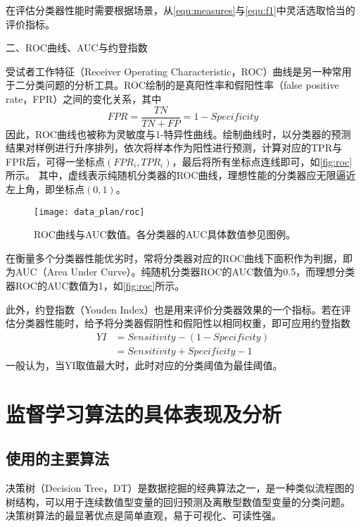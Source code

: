 在评估分类器性能时需要根据场景，从\autoref{equ:measures}与\autoref{equ:f1}中灵活选取恰当的评价指标。

二、ROC曲线、AUC与约登指数

受试者工作特征（Receiver Operating Characteristic，ROC）曲线是另一种常用于二分类问题的分析工具。ROC绘制的是真阳性率和假阳性率（false positive rate，FPR）之间的变化关系，其中
\begin{equation}
      \label{equ:fpr}
      FPR=\frac{TN}{TN+FP}=1-Specificity
\end{equation}
因此，ROC曲线也被称为灵敏度与1-特异性曲线。绘制曲线时，以分类器的预测结果对样例进行升序排列，依次将样本作为阳性进行预测，计算对应的TPR与FPR后，可得一坐标点$({FPR}_i,{TPR}_i)$，最后将所有坐标点连线即可，如\autoref{fig:roc}所示。
其中，虚线表示纯随机分类器的ROC曲线，理想性能的分类器应无限逼近左上角，即坐标点$(0,1)$。
\begin{figure}[htbp]
      \centering
      \texttt{[image: data\_plan/roc]}
      \caption[ROC曲线与AUC数值]{\label{fig:roc}ROC曲线与AUC数值。各分类器的AUC具体数值参见图例。}
\end{figure}

在衡量多个分类器性能优劣时，常将分类器对应的ROC曲线下面积作为判据，即为AUC（Area Under Curve）。纯随机分类器ROC的AUC数值为0.5，而理想分类器ROC的AUC数值为1，如\autoref{fig:roc}所示。

此外，约登指数（Youden Index）也是用来评价分类器效果的一个指标。若在评估分类器性能时，给予将分类器假阴性和假阳性以相同权重，即可应用约登指数
\begin{equation}
      \label{equ:yi}
      \begin{aligned}
            YI&=Sensitivity-(1-Specificity)\\
            &=Sensitivity+Specificity-1
      \end{aligned}
\end{equation}
一般认为，当YI取值最大时，此时对应的分类阈值为最佳阈值\cite{cwl}。
\section{监督学习算法的具体表现及分析}
\subsection{使用的主要算法}
决策树（Decision Tree，DT）是数据挖掘的经典算法之一，是一种类似流程图的树结构，可以用于连续数值型变量的回归预测及离散型数值型变量的分类问题\cite{Li2017,Liu2018}。
决策树算法的最显著优点是简单直观，易于可视化、可读性强。

